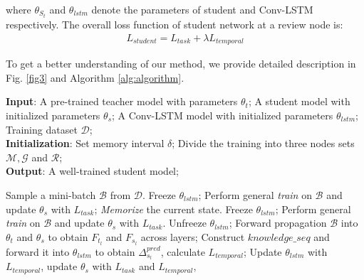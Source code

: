 \documentclass[letterpaper]{article} %
\begin{document}
 \noindent where $\theta_{S_{t}}$ and $\theta_{lstm}$ denote the parameters of student and Conv-LSTM respectively. The overall loss function of student network at a review node is:
\begin{align}
    L_{student} = L_{task} + \lambda L_{temporal}
\end{align}

To get a better understanding of our method, we provide detailed description in Fig. \ref{fig3} and Algorithm \ref{alg:algorithm}.
\begin{algorithm}[htpb]\small
\caption{Temporal Supervised Knowledge Distillation}
\label{alg:algorithm}
\textbf{Input}: A pre-trained teacher model with parameters $\theta_{t}$; A student model with initialized parameters $\theta_{s}$; A Conv-LSTM model with initialized parameters $\theta_{lstm}$; Training dataset $\mathcal{D}$;\\
\textbf{Initialization}: Set memory interval $\delta$; Divide the training into three nodes sets $\mathcal{M},\mathcal{G}$ and $\mathcal{R}$; \\
\textbf{Output}: A well-trained student model;

\begin{algorithmic}[1] %
\STATE Sample a mini-batch $\mathcal{B}$ from $\mathcal{D}$.
\STATE Freeze $\theta_{lstm}$;
\STATE Perform general \emph{train} on $\mathcal{B}$ and update $\theta_{s}$ with $L_{task}$;
\STATE \emph{Memorize} the current state.
\STATE Freeze $\theta_{lstm}$;
\STATE Perform general \emph{train} on $\mathcal{B}$ and update $\theta_{s}$ with $L_{task}$.
\STATE Unfreeze $\theta_{lstm}$;
\STATE Forward propagation $\mathcal{B}$ into $\theta_{t}$ and $\theta_{s}$ to obtain $F_{t_{l}}$ and $F_{s_{l}}$ across layers;
\STATE Construct $knowledge\_seq$ and forward it into $\theta_{lstm}$ to obtain $\Delta^{pred}_{s_{l}}$, calculate $L_{temporal}$;
\STATE Update $\theta_{lstm}$ with $L_{temporal}$, update $\theta_{s}$ with $L_{task}$ and $L_{temporal}$,
\ENDIF
\ENDWHILE
\end{algorithmic}
\end{algorithm}
\end{document}
